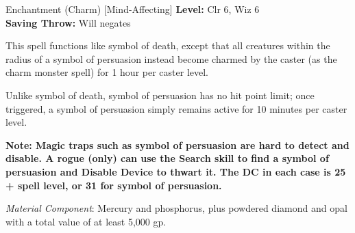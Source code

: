 {Enchantment (Charm) [Mind-Affecting]}
{
	\textbf{Level:}
	Clr 6, Wiz 6\\
	\textbf{Saving Throw:}
	Will negates\\
}
{
	This spell functions like symbol of death, except that all creatures within the radius of a symbol of persuasion instead become charmed by the caster (as the charm monster spell) for 1 hour per caster level.

	Unlike symbol of death, symbol of persuasion has no hit point limit; once triggered, a symbol of persuasion simply remains active for 10 minutes per caster level.

	\textbf{Note: Magic traps such as symbol of persuasion are hard to detect and disable. A rogue (only) can use the Search skill to find a symbol of persuasion and Disable Device to thwart it. The DC in each case is 25 + spell level, or 31 for symbol of persuasion.}

	\textit{Material Component}:
	Mercury and phosphorus, plus powdered diamond and opal with a total value of at least 5,000 gp.

}
